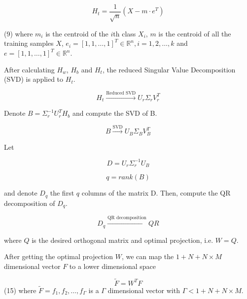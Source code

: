 \begin{equation}
H_t=\frac{1}{\sqrt{n}}(X-m\cdot e^T)
\end{equation}

                                         (9)
where $m_i$ is the centroid of the $i$th class $X_i$, $m$ is the centroid of all the training samples $X$, $e_i=[1,1,\dots,1]^T \in \mathbb{R}^n, i=1,2,\dots,k$ and $e=[1,1,\dots,1]^T \in \mathbb{R}^n$.

After calculating $H_w$, $H_b$ and $H_t$, the reduced Singular Value Decomposition (SVD) is applied to $H_t$.

\begin{equation}
H_t \xrightarrow{\text{Reduced SVD}} U_r \Sigma_r V_r^T
\end{equation}

Denote $B=\Sigma_r^{-1} U_r^T H_b$ and compute the SVD of B.

\begin{equation}
B \xrightarrow{\text{SVD}} U_B \Sigma_B V_B^T
\end{equation}

Let

\begin{equation}
D=U_r\Sigma_r^{-1}U_B
\end{equation}

\begin{equation}
q=rank(B)
\end{equation}

and denote $D_q$ the first $q$ columns of the matrix D. Then, compute the QR decomposition of $D_q$.

\begin{equation}
D_q \xrightarrow{\text{QR decomposition}} QR
\end{equation}

where $Q$ is the desired orthogonal matrix and optimal projection, i.e. $W=Q$.

After getting the optimal projection $W$, we can map the $1+N+N\times M$ dimensional vector $F$ to a lower dimensional space

\begin{equation}
\tilde{F}=W^T F
\end{equation}
                                             (15)
where $\tilde{F}={f_1,f_2,\dots,f_{\Gamma}}$ is a $\Gamma$ dimensional vector with $\Gamma<1+N+N\times M$.
